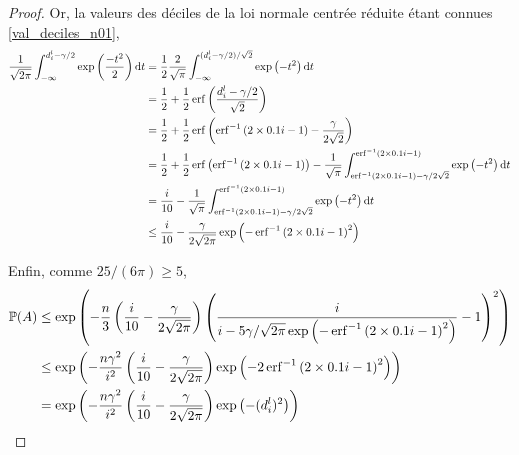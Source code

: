 \begin{proof}
    Or, la valeurs des déciles de la loi normale centrée réduite étant connues \ref{val_deciles_n01},
    \begin{align*}
        \dfrac{1}{\sqrt{2\pi}} \int_{-\infty}^{d^l_i - \gamma/2}   \exp\left( \dfrac{-t^2}{2} \right)\mathrm{d} t & = \dfrac{1}{2}\dfrac{2}{\sqrt{\pi}}  \int_{-\infty}^{(d^l_i - \gamma/2)/\sqrt 2}   \exp\left( {-t^2} \right)\mathrm{d} t\\
        & = \dfrac{1}{2} + \dfrac{1}{2}\operatorname{erf}\left( \dfrac{d^l_i - \gamma/2}{\sqrt 2 }\right)\\
        & = \dfrac{1}{2} + \dfrac{1}{2}\operatorname{erf}\left( \operatorname{erf}^{-1}\left( 2\times 0.1i - 1 \right) - \dfrac{\gamma}{2\sqrt 2 }\right)\\
        & = \dfrac{1}{2} + \dfrac{1}{2}\operatorname{erf}\left( \operatorname{erf}^{-1}\left( 2\times 0.1i - 1 \right)\right) - \dfrac{1}{\sqrt{\pi}}\int_{\operatorname{erf}^{-1}\left( 2\times 0.1i - 1 \right) - \gamma/2\sqrt 2}^{\operatorname{erf}^{-1}\left( 2\times 0.1i - 1 \right)} \exp\left( -t^2 \right)\mathrm{d} t\\
        & = \dfrac{i}{10} - \dfrac{1}{\sqrt{\pi}}\int_{\operatorname{erf}^{-1}\left( 2\times 0.1i - 1 \right) - \gamma/2\sqrt 2}^{\operatorname{erf}^{-1}\left( 2\times 0.1i - 1 \right)} \exp\left( -t^2 \right)\mathrm{d} t\\
        & \leq \dfrac{i}{10} - \dfrac{\gamma}{2\sqrt{2\pi}} \exp\left( - \operatorname{erf}^{-1}\left(2\times 0.1i - 1 \right)^2\right) \\
    \end{align*}

    Enfin, comme \(25/(6\pi) \geq 5\),
    \begin{align*}
        \mathbb P(A) & \leq \exp\left( - \dfrac{n}{3} \left( \dfrac{i}{10} - \dfrac{\gamma}{2\sqrt{2\pi}}\right)\left( \dfrac{i}{i - {5\gamma}/{\sqrt{2\pi}} \exp\left( - \operatorname{erf}^{-1}\left(2\times 0.1i - 1 \right)^2\right)}  - 1 \right)^2\right)\\
        & \leq \exp\left( - \dfrac{n\gamma^2}{i^2} \left( \dfrac{i}{10} - \dfrac{\gamma}{2\sqrt{2\pi}}\right)\exp\left( - 2\operatorname{erf}^{-1}\left(2\times 0.1i - 1 \right)^2\right)\right)\\
        & = \exp\left( - \dfrac{n\gamma^2}{i^2} \left( \dfrac{i}{10} - \dfrac{\gamma}{2\sqrt{2\pi}}\right)\exp\left( - (d_i^l)^2\right)\right)
    \end{align*}


\end{proof}
